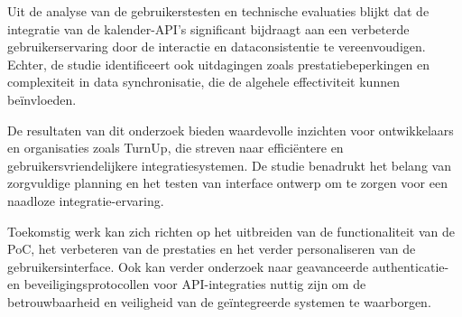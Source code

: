 Uit de analyse van de gebruikerstesten en technische evaluaties blijkt dat de integratie van de kalender-API's significant bijdraagt aan een verbeterde gebruikerservaring door de interactie en dataconsistentie te vereenvoudigen. Echter, de studie identificeert ook uitdagingen zoals prestatiebeperkingen en complexiteit in data synchronisatie, die de algehele effectiviteit kunnen beïnvloeden.

De resultaten van dit onderzoek bieden waardevolle inzichten voor ontwikkelaars en organisaties zoals TurnUp, die streven naar efficiëntere en gebruikersvriendelijkere integratiesystemen. De studie benadrukt het belang van zorgvuldige planning en het testen van interface ontwerp om te zorgen voor een naadloze integratie-ervaring.

Toekomstig werk kan zich richten op het uitbreiden van de functionaliteit van de PoC, het verbeteren van de prestaties en het verder personaliseren van de gebruikersinterface. Ook kan verder onderzoek naar geavanceerde authenticatie- en beveiligingsprotocollen voor API-integraties nuttig zijn om de betrouwbaarheid en veiligheid van de geïntegreerde systemen te waarborgen.
